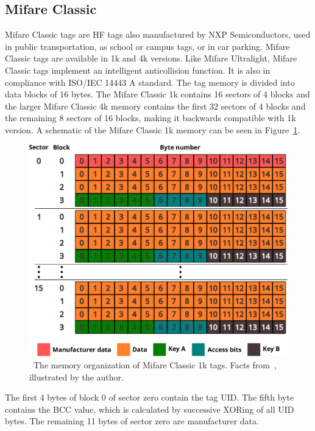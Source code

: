 \subsection{Mifare Classic}

Mifare Classic tags are HF tags also manufactured by NXP Semiconductors, used in public transportation, as school or campus tags, or in car parking. Mifare Classic tags are available in 1k and 4k versions. Like Mifare Ultralight, Mifare Classic tags implement an intelligent anticollision function. It is also in compliance with ISO/IEC 14443 A standard. The tag memory is divided into data blocks of 16 bytes. The Mifare Classic 1k contains 16 sectors of 4 blocks and the larger Mifare Classic 4k memory contains the first 32 sectors of 4 blocks and the remaining 8 sectors of 16 blocks, making it backwards compatible with 1k version. A schematic of the Mifare Classic 1k memory can be seen in Figure~\ref{fig:classsic1kmemory}.~\cite{classic1kdatasheet, classic4kdatasheet}

\begin{figure}[ht]
  \centering
  \includegraphics[width=12cm]{text/theoretical_background/classic1k_data.pdf}
  \caption[The memory organization of Mifare Classic 1k tags.]{~The memory organization of Mifare Classic 1k tags. Facts from~\cite{classic1kdatasheet}, illustrated by the author.}
  \label{fig:classsic1kmemory}
\end{figure}

The first 4 bytes of block 0 of sector zero contain the tag UID. The fifth byte contains the BCC value, which is calculated by successive XORing of all UID bytes. The remaining 11 bytes of sector zero are manufacturer data.~\cite{gans2008practical}

